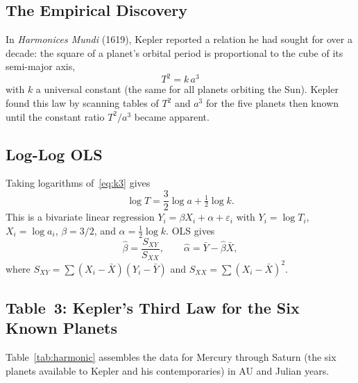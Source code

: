 \documentclass[12pt]{article}
\begin{document}
\subsection{The Empirical Discovery}

In \emph{Harmonices Mundi} (1619), Kepler reported a relation he had
sought for over a decade: the square of a planet's orbital period is
proportional to the cube of its semi-major axis,
\begin{equation}\label{eq:k3}
  \boxed{T^{2} = k\,a^{3}}
\end{equation}
with $k$ a universal constant (the same for all planets orbiting the Sun).
Kepler found this law by scanning tables of $T^{2}$ and $a^{3}$ for the
five planets then known until the constant ratio $T^{2}/a^{3}$ became
apparent.

\subsection{Log-Log OLS}

Taking logarithms of~\eqref{eq:k3} gives
\[
  \log T = \frac{3}{2}\log a + \tfrac12 \log k.
\]
This is a bivariate linear regression
$Y_{i} = \beta X_{i} + \alpha + \varepsilon_{i}$
with $Y_{i}=\log T_{i}$, $X_{i}=\log a_{i}$, $\beta=3/2$, and
$\alpha=\frac12\log k$.
OLS gives
\[
  \hat\beta
  = \frac{S_{XY}}{S_{XX}},
  \qquad
  \hat\alpha = \bar Y - \hat\beta\bar X,
\]
where $S_{XY}=\sum(X_{i}-\bar X)(Y_{i}-\bar Y)$ and
$S_{XX}=\sum(X_{i}-\bar X)^{2}$.

\subsection{Table~3: Kepler's Third Law for the Six Known Planets}

Table~\ref{tab:harmonic} assembles the data for Mercury through Saturn
(the six planets available to Kepler and his contemporaries) in AU and
Julian years.
\end{document}
